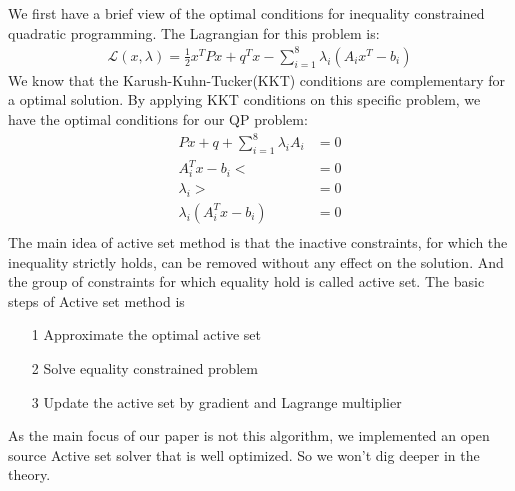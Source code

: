 We first have a brief view of the optimal conditions for inequality constrained quadratic programming. The Lagrangian for this problem is:
\begin{equation}\label{eq:Lagrangian}
	\begin{split}
		\mathcal{L}(x,\lambda)=\frac{1}{2}x^TPx + q^Tx - \sum_{i=1}^8\lambda_i(A_ix^T-b_i)
	\end{split}
\end{equation}
We know that the Karush-Kuhn-Tucker(KKT) conditions are complementary for a optimal solution. By applying KKT conditions on this specific problem, we have the optimal conditions for our QP problem:
\begin{equation}\label{eq:Lagrangian}
	\begin{split}
		Px+q+\sum_{i=1}^8\lambda_i A_i &=0\\
		A_i^Tx-b_i <&=0\\
		\lambda_i >&=0\\
		\lambda_i(A_i^Tx-b_i) &=0\\
	\end{split}
\end{equation}
The main idea of active set method is that the inactive constraints, for which the inequality strictly holds, can be removed without any effect on the solution. And the group of constraints for which equality hold is called active set. The basic steps of Active set method is 
\begin{itemize}
    \item[1] Approximate the optimal active set
    \item[2] Solve equality constrained problem
    \item[3] Update the active set by gradient and Lagrange multiplier
\end{itemize}
As the main focus of our paper is not this algorithm, we implemented an open source Active set solver that is well optimized. So we won't dig deeper in the theory. 

